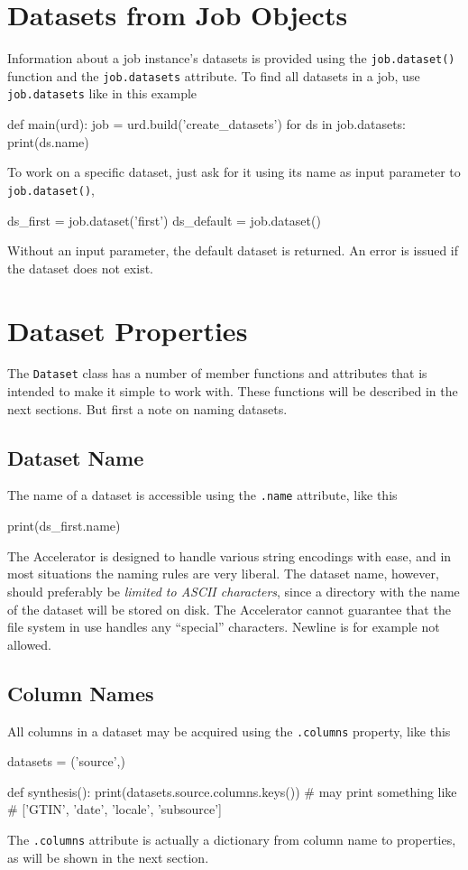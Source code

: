 \section{Datasets from Job Objects}
Information about a job instance's datasets is provided using
the \texttt{job.dataset()} function and the \texttt{job.datasets}
attribute.  To find all datasets in a job, use \texttt{job.datasets}
like in this example
\begin{python}
def main(urd):
    job = urd.build('create_datasets')
    for ds in job.datasets:
        print(ds.name)
\end{python}
To work on a specific dataset, just ask for it using its name as input
parameter to \texttt{job.dataset()},
\begin{python}
    ds_first = job.dataset('first')
    ds_default = job.dataset()
\end{python}
Without an input parameter, the default dataset is returned.  An error
is issued if the dataset does not exist.

                      

\section{Dataset Properties}
The \texttt{Dataset} class has a number of member functions and
attributes that is intended to make it simple to work with.  These
functions will be described in the next sections.  But first a note on
naming datasets.


\subsection{Dataset Name}
The name of a dataset is accessible using the \texttt{.name}
attribute, like this
\begin{python}
    print(ds_first.name)
\end{python}
The Accelerator is designed to handle various string encodings with
ease, and in most situations the naming rules are very liberal.  The
dataset name, however, should preferably be \textsl{limited to ASCII
characters}, since a directory with the name of the dataset will be
stored on disk.  The Accelerator cannot guarantee that the file system
in use handles any ``special'' characters.  Newline is for example not
allowed.


\subsection{Column Names}
All columns in a dataset may be acquired using the \texttt{.columns}
property, like this
\begin{python}
datasets = ('source',)

def synthesis():
    print(datasets.source.columns.keys())
    # may print something like
    # ['GTIN', 'date', 'locale', 'subsource']
\end{python}
The \texttt{.columns} attribute is actually a dictionary from column
name to properties, as will be shown in the next section.


